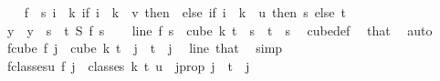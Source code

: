 \begin{isabellebody}
\isanewline
\ \ \isamarkupfalse%
\ {\isacharquery}{\kern0pt}f\ {\isacharequal}{\kern0pt}\ {\isachardoublequoteopen}{\isasymlambda}s{\isachardot}{\kern0pt}\ {\isacharparenleft}{\kern0pt}{\isasymlambda}i\ {\isasymin}\ {\isacharbraceleft}{\kern0pt}{\isachardot}{\kern0pt}{\isachardot}{\kern0pt}{\isacharless}{\kern0pt}k{\isacharbraceright}{\kern0pt}{\isachardot}{\kern0pt}\ if\ i\ {\isacharless}{\kern0pt}\ k\ {\isacharminus}{\kern0pt}\ v\ then\ {}\ else\ {\isacharparenleft}{\kern0pt}if\ i\ {\isacharless}{\kern0pt}\ k\ {\isacharminus}{\kern0pt}\ u\ then\ s\ else\ t{\isacharparenright}{\kern0pt}{\isacharparenright}{\kern0pt}{\isachardoublequoteclose}\isanewline
\ \ \isamarkupfalse%
\ y\ \ {\isachardoublequoteopen}y\ {\isasymequiv}\ {\isacharparenleft}{\kern0pt}{\isasymlambda}s\ {\isasymin}\ {\isacharbraceleft}{\kern0pt}{\isachardot}{\kern0pt}{\isachardot}{\kern0pt}t{\isacharbraceright}{\kern0pt}{\isachardot}{\kern0pt}\ S\ {\isacharparenleft}{\kern0pt}{\isacharquery}{\kern0pt}f\ s{\isacharparenright}{\kern0pt}{\isacharparenright}{\kern0pt}{\isachardoublequoteclose}\isanewline
\isanewline
\ \ \isamarkupfalse%
\ line{}{\isacharcolon}{\kern0pt}\ {\isachardoublequoteopen}{\isacharquery}{\kern0pt}f\ s\ {\isasymin}\ cube\ k\ {\isacharparenleft}{\kern0pt}t{\isacharplus}{\kern0pt}{}{\isacharparenright}{\kern0pt}{\isachardoublequoteclose}\ \ {\isachardoublequoteopen}s\ {\isasymle}\ t{\isachardoublequoteclose}\ \ s\ \isamarkupfalse%
\ cube{\isacharunderscore}{\kern0pt}def\ \isamarkupfalse%
\ that\ \isamarkupfalse%
\ auto\isanewline
\isanewline
\ \ \isamarkupfalse%
\ f{\isacharunderscore}{\kern0pt}cube{\isacharcolon}{\kern0pt}\ {\isachardoublequoteopen}{\isacharquery}{\kern0pt}f\ j\ {\isasymin}\ cube\ k\ {\isacharparenleft}{\kern0pt}t{\isacharplus}{\kern0pt}{}{\isacharparenright}{\kern0pt}{\isachardoublequoteclose}\ \ {\isachardoublequoteopen}j\ {\isacharless}{\kern0pt}\ t{\isacharplus}{\kern0pt}{}{\isachardoublequoteclose}\ \ j\ \isamarkupfalse%
\ line{}\ that\ \isamarkupfalse%
\ simp\isanewline
\ \ \isamarkupfalse%
\ f{\isacharunderscore}{\kern0pt}classes{\isacharunderscore}{\kern0pt}u{\isacharcolon}{\kern0pt}\ {\isachardoublequoteopen}{\isacharquery}{\kern0pt}f\ j\ {\isasymin}\ classes\ k\ t\ u{\isachardoublequoteclose}\ \ j{\isacharunderscore}{\kern0pt}prop{\isacharcolon}{\kern0pt}\ {\isachardoublequoteopen}j\ {\isacharless}{\kern0pt}\ t{\isachardoublequoteclose}\ \ j\isanewline

\end{isabellebody}
